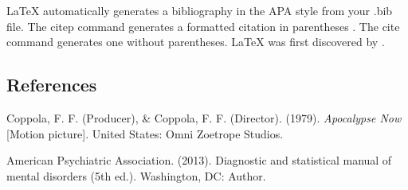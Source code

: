 \documentclass[a4paper,man,natbib]{apa6}
\begin{document}
LaTeX automatically generates a bibliography in the APA style from your .bib file. The citep command generates a formatted citation in parentheses \citep{Lamport1986}. The cite command generates one without parentheses. LaTeX was first discovered by \cite{Lamport1986}.

\pagebreak

\subsection{References}
Coppola, F. F. (Producer), \& Coppola, F. F. (Director). (1979). \textit{Apocalypse Now} [Motion picture]. United States: Omni Zoetrope Studios.

American Psychiatric Association. (2013). Diagnostic and statistical manual of mental disorders (5th ed.). Washington, DC: Author.
\end{document}
